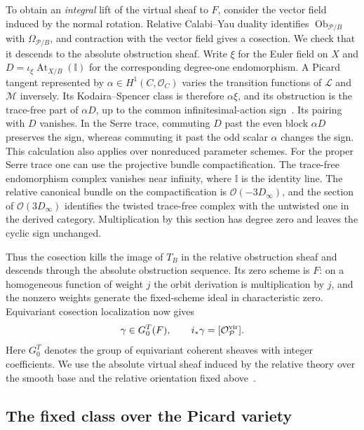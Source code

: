 To obtain an \emph{integral} lift of the virtual sheaf to \(F\), consider
the vector field induced by the normal rotation. Relative Calabi--Yau
duality identifies \(\operatorname{Ob}_{\mathcal P/B}\) with
\(\Omega_{\mathcal P/B}\), and contraction with the vector field gives
a cosection. We check that it descends to the absolute obstruction
sheaf. Write \(\xi\) for the Euler field on \(X\) and
\(D=\iota_\xi\operatorname{At}_{X/B}(\mathbb I)\) for the corresponding
degree-one endomorphism. A Picard tangent represented by
\(\alpha\in H^1(C,\mathcal O_C)\) varies the transition functions of
\(\mathcal L\) and \(\mathcal M\) inversely. Its Kodaira--Spencer class
is therefore \(\alpha\xi\), and its obstruction is the trace-free part
of \(\alpha D\), up to the common infinitesimal-action sign~\cite{ht}.
Its pairing with \(D\) vanishes. In the Serre trace, commuting \(D\)
past the even block \(\alpha D\) preserves the sign, whereas commuting
it past the odd scalar \(\alpha\) changes the sign. This calculation
also applies over nonreduced parameter schemes. For the proper Serre
trace one can use the projective bundle compactification. The trace-free
endomorphism complex vanishes near infinity, where \(\mathbb I\) is the
identity line. The relative canonical bundle on the compactification is
\(\mathcal O(-3D_\infty)\), and the section of
\(\mathcal O(3D_\infty)\) identifies the twisted trace-free complex
with the untwisted one in the derived category. Multiplication by this
section has degree zero and leaves the cyclic sign unchanged.

Thus the cosection kills the image of \(T_B\) in the relative obstruction
sheaf and descends through the absolute obstruction sequence. Its zero
scheme is \(F\): on a homogeneous function of weight \(j\) the orbit
derivation is multiplication by \(j\), and the nonzero weights
generate the fixed-scheme ideal in characteristic zero.
Equivariant cosection localization now gives
\begin{equation}
 \gamma\in G_0^T(F),\qquad i_*\gamma=[\mathcal O_{\mathcal P}^{\rm vir}].
 \label{eq:originalintegrallift}
\end{equation}
Here \(G_0^T\) denotes the group of equivariant coherent sheaves with
integer coefficients. We use the absolute virtual sheaf induced by the
relative theory over the smooth base and the relative orientation
fixed above~\cite{kiemli,kiemsavvas}.

\subsection{The fixed class over the Picard variety}

